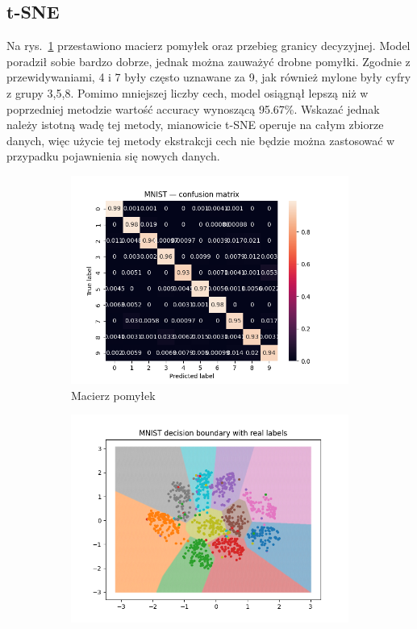 \documentclass[10pt]{article}
\begin{document}
\subsection*{t-SNE}

Na rys.~\ref{fig:tsne-cm} przestawiono macierz pomyłek oraz przebieg granicy decyzyjnej.
Model poradził sobie bardzo dobrze, jednak można zauważyć drobne pomyłki.
Zgodnie z przewidywaniami, 4 i 7 były często uznawane za 9, jak również mylone były cyfry z grupy 3,5,8.
Pomimo mniejszej liczby cech, model osiągnął lepszą niż w poprzedniej metodzie wartość accuracy wynoszącą 95.67\%.
Wskazać jednak należy istotną wadę tej metody, mianowicie t-SNE operuje na całym zbiorze danych, więc użycie tej metody
ekstrakcji cech nie będzie można zastosować w przypadku pojawnienia się nowych danych.

\begin{figure}[H]
    \centering
    \begin{subfigure}[t]{.5\textwidth}\centering
        \includegraphics[width=\linewidth]{img/mnist_tsne_cm.png}
        \caption{Macierz pomyłek}\label{fig:tsne-cm}
    \end{subfigure}
    \hspace{-3em}
    \begin{subfigure}[t]{.5\textwidth}\centering
        \includegraphics[width=\linewidth]{img/mnist_tsne_db.png}

\end{subfigure}
\end{figure}
\end{document}
